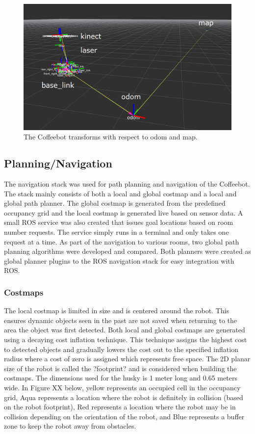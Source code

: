 \documentclass[letterpaper, 10 pt, conference]{ieeeconf}  %
\begin{document}
	\begin{figure}[!ht]
		\centering
		\includegraphics[width=1.0\columnwidth]{Figures/Transforms}
		\caption{The Coffeebot transforms with respect to odom and map.}
		\label{transforms}
	\end{figure}

\subsection{Planning/Navigation}

The navigation stack was used for path planning and navigation of the Coffeebot. The stack mainly consists of both a local and global costmap and a local and global path planner. The global costmap is generated from the predefined occupancy grid and the local costmap is generated live based on sensor data. A small ROS service was also created that issues goal locations based on room number requests. The service simply runs in a terminal and only takes one request at a time. As part of the navigation to various rooms, two global path planning algorithms were developed and compared. Both planners were created as global planner plugins to the ROS navigation stack for easy integration with ROS.

\subsubsection{Costmaps}

The local costmap is limited in size and is centered around the robot. This ensures dynamic objects seen in the past are not saved when returning to the area the object was first detected. Both local and global costmaps are generated using a decaying cost inflation technique. This technique assigns the highest cost to detected objects and gradually lowers the cost out to the specified inflation radius where a cost of zero is assigned which represents free space. The 2D planar size of the robot is called the ?footprint? and is considered when building the costmaps. The dimensions used for the husky is 1 meter long and 0.65 meters wide. In Figure XX below, yellow represents an occupied cell in the occupancy grid, Aqua represents a location where the robot is definitely in collision (based on the robot footprint), Red represents a location where the robot may be in collision depending on the orientation of the robot, and Blue represents a buffer zone to keep the robot away from obstacles.
\end{document}
